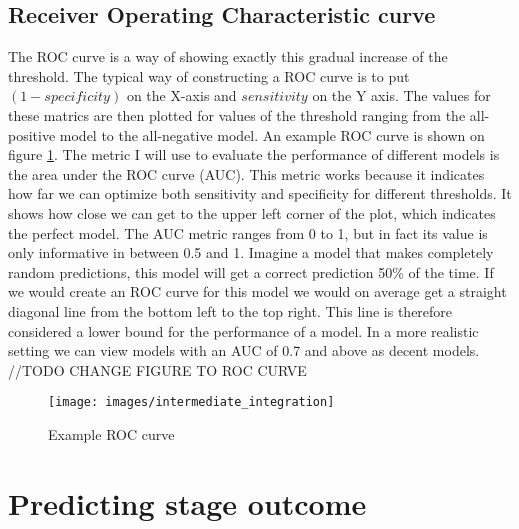 \subsection{Receiver Operating Characteristic curve}
The ROC curve is a way of showing exactly this gradual increase of the threshold. The typical way of constructing a ROC curve is to put $(1-specificity)$ on the X-axis and $sensitivity$ on the Y axis. The values for these matrics are then plotted for values of the threshold ranging from the all-positive model to the all-negative model. An example ROC curve is shown on figure \ref{fig:evaluation-roc}. The metric I will use to evaluate the performance of different models is the area under the ROC curve (AUC). This metric works because it indicates how far we can optimize both sensitivity and specificity for different thresholds. It shows how close we can get to the upper left corner of the plot, which indicates the perfect model. The AUC metric ranges from 0 to 1, but in fact its value is only informative in between 0.5 and 1. Imagine a model that makes completely random predictions, this model will get a correct prediction 50\% of the time. If we would create an ROC curve for this model we would on average get a straight diagonal line from the bottom left to the top right. This line is therefore considered a lower bound for the performance of a model. In a more realistic setting we can view models with an AUC of 0.7 and above as decent models.
//TODO CHANGE FIGURE TO ROC CURVE
\begin{figure}
	\centering
	\texttt{[image: images/intermediate\_integration]}
	\caption{Example ROC curve}
	\label{fig:evaluation-roc}
\end{figure}
\section{Predicting stage outcome}
\label{sec:evaluation-predictingstage}
